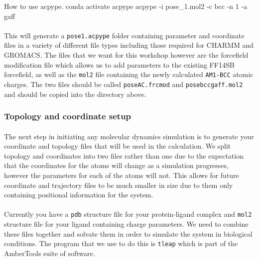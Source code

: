     \begin{bashcmd}[label=listing:acpypeCMD]{How to use acpype.}
        conda activate acpype
        acpype -i pose_1.mol2 -c bcc -n 1 -a gaff
    \end{bashcmd}

    \paragraph{}
        This will generate a \texttt{pose\textunderscore 1.acpype} folder containing parameter and coordinate files in a variety of different file types including those required for CHARMM\cite{Brooks1983CHARMM:Calculations} and GROMACS\cite{Berendsen1995GROMACS:Implementation}. The files that we want for this workshop however are the forcefield modification file which allows us to add parameters to the existing FF14SB\cite{Maier2015Ff14SB:Ff99SB} forcefield, as well as the \texttt{mol2} file containing the newly calculated \texttt{AM1-BCC} atomic charges. The two files should be called \texttt{pose\textunderscore AC.frcmod} and \texttt{pose\textunderscore bcc\textunderscore gaff.mol2} and should be copied into the directory above.

\subsubsection{Topology and coordinate setup}
    \paragraph{}
        The next step in initiating any molecular dynamics simulation is to generate your coordinate and topology files that will be used in the calculation. We split topology and coordinates into two files rather than one due to the expectation that the coordinates for the atoms will change as a simulation progresses, however the parameters for each of the atoms will not. This allows for future coordinate and trajectory files to be much smaller in size due to them only containing positional information for the system.

    \paragraph{}
        Currently you have a \texttt{pdb} structure file for your protein-ligand complex and \texttt{mol2} structure file for your ligand containing charge parameters. We need to combine these files together and solvate them in order to simulate the system in biological conditions. The program that we use to do this is \texttt{tleap} which is part of the AmberTools suite of software.

